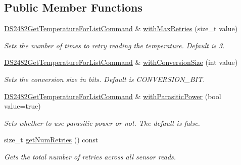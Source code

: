 \subsection*{Public Member Functions}
\begin{DoxyCompactItemize}
\item 
\mbox{\label{class_d_s2482_get_temperature_for_list_command_abf3514034c3423dac4a17a02ea9928b8}} 
\mbox{\hyperlink{class_d_s2482_get_temperature_for_list_command}{D\+S2482\+Get\+Temperature\+For\+List\+Command}} \& \mbox{\hyperlink{class_d_s2482_get_temperature_for_list_command_abf3514034c3423dac4a17a02ea9928b8}{with\+Max\+Retries}} (size\+\_\+t value)
\begin{DoxyCompactList}\small\item\em Sets the number of times to retry reading the temperature. Default is 3. \end{DoxyCompactList}\item 
\mbox{\hyperlink{class_d_s2482_get_temperature_for_list_command}{D\+S2482\+Get\+Temperature\+For\+List\+Command}} \& \mbox{\hyperlink{class_d_s2482_get_temperature_for_list_command_a2e9bb74693d3644df1d503a168f7da72}{with\+Conversion\+Size}} (int value)
\begin{DoxyCompactList}\small\item\em Sets the conversion size in bits. Default is C\+O\+N\+V\+E\+R\+S\+I\+O\+N\+\_\+B\+IT. \end{DoxyCompactList}\item 
\mbox{\label{class_d_s2482_get_temperature_for_list_command_af1a1456ab9c30f667fcdeeff6091dd33}} 
\mbox{\hyperlink{class_d_s2482_get_temperature_for_list_command}{D\+S2482\+Get\+Temperature\+For\+List\+Command}} \& \mbox{\hyperlink{class_d_s2482_get_temperature_for_list_command_af1a1456ab9c30f667fcdeeff6091dd33}{with\+Parasitic\+Power}} (bool value=true)
\begin{DoxyCompactList}\small\item\em Sets whether to use parasitic power or not. The default is false. \end{DoxyCompactList}\item 
size\+\_\+t \mbox{\hyperlink{class_d_s2482_get_temperature_for_list_command_a962f91c29fa4a2a1d5c02ab2f4c120a9}{get\+Num\+Retries}} () const
\begin{DoxyCompactList}\small\item\em Gets the total number of retries across all sensor reads. \end{DoxyCompactList}\end{DoxyCompactItemize}
